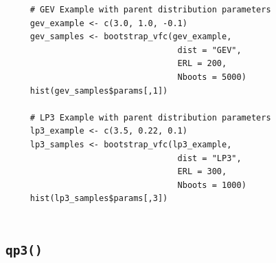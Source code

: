 \documentclass[
  letterpaper,
  DIV=11,
  numbers=noendperiod]{scrreprt}
\begin{document}
\begin{verbatim}
     # GEV Example with parent distribution parameters
     gev_example <- c(3.0, 1.0, -0.1)
     gev_samples <- bootstrap_vfc(gev_example,
                                   dist = "GEV",
                                   ERL = 200,
                                   Nboots = 5000)
     hist(gev_samples$params[,1])
     
     # LP3 Example with parent distribution parameters
     lp3_example <- c(3.5, 0.22, 0.1)
     lp3_samples <- bootstrap_vfc(lp3_example,
                                   dist = "LP3",
                                   ERL = 300,
                                   Nboots = 1000)
     hist(lp3_samples$params[,3])
     
\end{verbatim}

\subsection{\texorpdfstring{\texttt{qp3()}}{qp3()}}\label{qp3}
\end{document}
